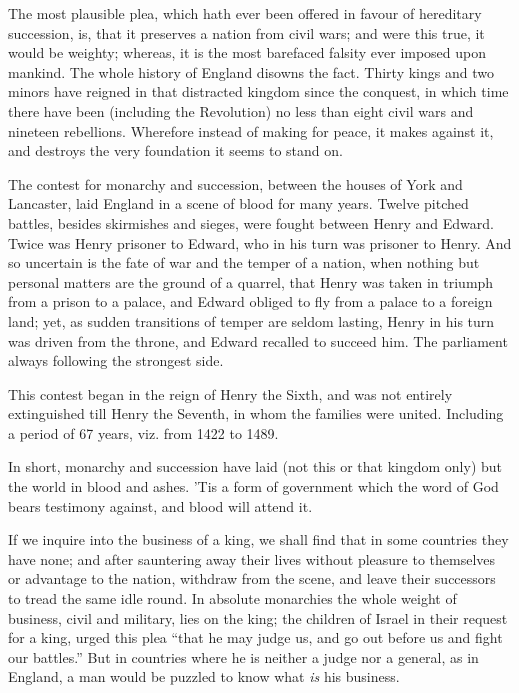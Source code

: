 \documentclass[12pt, twocolumn]{book}
\begin{document}
    The most plausible plea, which hath ever been offered in favour of hereditary succession, is, that it preserves a nation from civil wars; and were this true, it would be weighty; whereas, it is the most barefaced falsity ever imposed upon mankind. The whole history of England disowns the fact. Thirty kings and two minors have reigned in that distracted kingdom since the conquest, in which time there have been (including the Revolution) no less than eight civil wars and nineteen rebellions. Wherefore instead of making for peace, it makes against it, and destroys the very foundation it seems to stand on.

    The contest for monarchy and succession, between the houses of York and Lancaster, laid England in a scene of blood for many years. Twelve pitched battles, besides skirmishes and sieges, were fought between Henry and Edward. Twice was Henry prisoner to Edward, who in his turn was prisoner to Henry. And so uncertain is the fate of war and the temper of a nation, when nothing but personal matters are the ground of a quarrel, that Henry was taken in triumph from a prison to a palace, and Edward obliged to fly from a palace to a foreign land; yet, as sudden transitions of temper are seldom lasting, Henry in his turn was driven from the throne, and Edward recalled to succeed him. The parliament always following the strongest side.

    This contest began in the reign of Henry the Sixth, and was not entirely extinguished till Henry the Seventh, in whom the families were united. Including a period of 67 years, viz. from 1422 to 1489.

    In short, monarchy and succession have laid (not this or that kingdom only) but the world in blood and ashes. ’Tis a form of government which the word of God bears testimony against, and blood will attend it.

    If we inquire into the business of a king, we shall find that in some countries they have none; and after sauntering away their lives without pleasure to themselves or advantage to the nation, withdraw from the scene, and leave their successors to tread the same idle round. In absolute monarchies the whole weight of business, civil and military, lies on the king; the children of Israel in their request for a king, urged this plea “that he may judge us, and go out before us and fight our battles.” But in countries where he is neither a judge nor a general, as in England, a man would be puzzled to know what \textit{is} his business.
\end{document}
